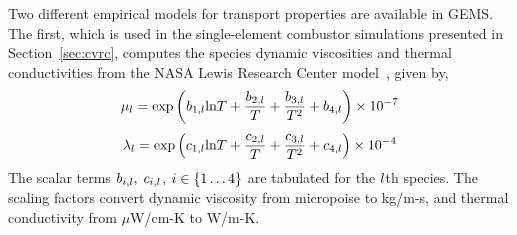 Two different empirical models for transport properties are available in GEMS. The first, which is used in the single-element combustor simulations presented in Section~\ref{sec:cvrc}, computes the species dynamic viscosities and thermal conductivities from the NASA Lewis Research Center model~\cite{Svehla1995}, given by,
%
\begin{equation}
	\mu_{l} = \text{exp} \left(b_{1,l} \text{ln} T + \frac{b_{2,l}}{T} + \frac{b_{3,l}}{T^2} + b_{4,l} \right) \times 10^{-7}
\end{equation}
%
\begin{equation}
	\lambda_{l} = \text{exp} \left(c_{1,l} \text{ln} T + \frac{c_{2,l}}{T} + \frac{c_{3,l}}{T^2} + c_{4,l} \right) \times 10^{-4}
\end{equation}
%
The scalar terms $b_{i,l}, \; c_{i,l}$, $i \in \{1 \hdots 4\}$ are tabulated for the $l$th species. The scaling factors convert dynamic viscosity from micropoise to kg/m-s, and thermal conductivity from $\mu$W/cm-K to W/m-K.

